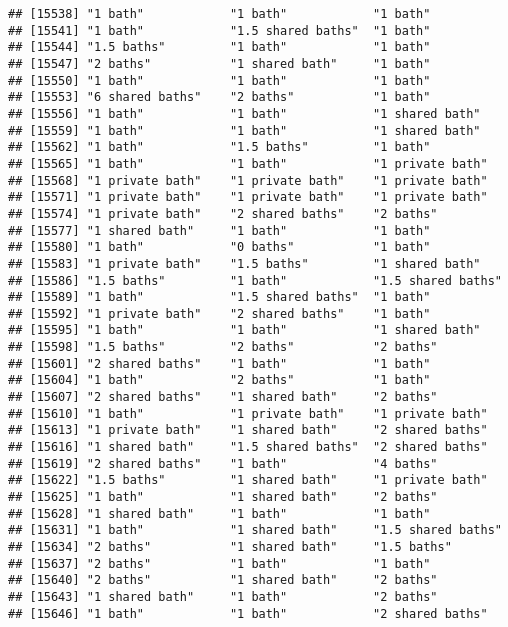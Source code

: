 \documentclass[
]{article}
\begin{document}
\begin{verbatim}
## [15538] "1 bath"            "1 bath"            "1 bath"           
## [15541] "1 bath"            "1.5 shared baths"  "1 bath"           
## [15544] "1.5 baths"         "1 bath"            "1 bath"           
## [15547] "2 baths"           "1 shared bath"     "1 bath"           
## [15550] "1 bath"            "1 bath"            "1 bath"           
## [15553] "6 shared baths"    "2 baths"           "1 bath"           
## [15556] "1 bath"            "1 bath"            "1 shared bath"    
## [15559] "1 bath"            "1 bath"            "1 shared bath"    
## [15562] "1 bath"            "1.5 baths"         "1 bath"           
## [15565] "1 bath"            "1 bath"            "1 private bath"   
## [15568] "1 private bath"    "1 private bath"    "1 private bath"   
## [15571] "1 private bath"    "1 private bath"    "1 private bath"   
## [15574] "1 private bath"    "2 shared baths"    "2 baths"          
## [15577] "1 shared bath"     "1 bath"            "1 bath"           
## [15580] "1 bath"            "0 baths"           "1 bath"           
## [15583] "1 private bath"    "1.5 baths"         "1 shared bath"    
## [15586] "1.5 baths"         "1 bath"            "1.5 shared baths" 
## [15589] "1 bath"            "1.5 shared baths"  "1 bath"           
## [15592] "1 private bath"    "2 shared baths"    "1 bath"           
## [15595] "1 bath"            "1 bath"            "1 shared bath"    
## [15598] "1.5 baths"         "2 baths"           "2 baths"          
## [15601] "2 shared baths"    "1 bath"            "1 bath"           
## [15604] "1 bath"            "2 baths"           "1 bath"           
## [15607] "2 shared baths"    "1 shared bath"     "2 baths"          
## [15610] "1 bath"            "1 private bath"    "1 private bath"   
## [15613] "1 private bath"    "1 shared bath"     "2 shared baths"   
## [15616] "1 shared bath"     "1.5 shared baths"  "2 shared baths"   
## [15619] "2 shared baths"    "1 bath"            "4 baths"          
## [15622] "1.5 baths"         "1 shared bath"     "1 private bath"   
## [15625] "1 bath"            "1 shared bath"     "2 baths"          
## [15628] "1 shared bath"     "1 bath"            "1 bath"           
## [15631] "1 bath"            "1 shared bath"     "1.5 shared baths" 
## [15634] "2 baths"           "1 shared bath"     "1.5 baths"        
## [15637] "2 baths"           "1 bath"            "1 bath"           
## [15640] "2 baths"           "1 shared bath"     "2 baths"          
## [15643] "1 shared bath"     "1 bath"            "2 baths"          
## [15646] "1 bath"            "1 bath"            "2 shared baths"   

\end{verbatim}
\end{document}
